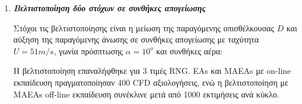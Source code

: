 \documentclass[twoside, 12pt,notitlepage]{report}
\begin{document}
\begin{enumerate}
\item \textbf{\textit{Βελτιστοποίηση δύο στόχων σε συνθήκες 
απογείωσης}} 

Στόχοι τις βελτιστοποίησης είναι η μείωση της παραγόμενης 
οπισθέλκουσας $D$ και αύξηση της παραγόμενης άνωσης σε συνθήκες 
απογείωσης με ταχύτητα $U=51 m/s$, γωνία πρόσπτωσης $α=10^{ο}$ και 
συνθήκες αέρα:

\begin{table}[h!]
\centering
\caption{Ιδιότητες ρευστού σε μηδενικό υψόμετρο}
\end{table}   

\vspace{-2mm}

Η βελτιστοποίηση επαναλήφθηκε για 3 τιμές RNG. EAs και MAEAs με 
on-line εκπαίδευση πραγματοποίησαν 400 CFD αξιολογήσεις, ενώ η 
βελτιστοποίηση με MAEAs off-line εκπαίδευση συνέκλινε μετά από 1000 
εκτιμήσεις ανά κύκλο. 

\newpage



\end{enumerate}
\end{document}
